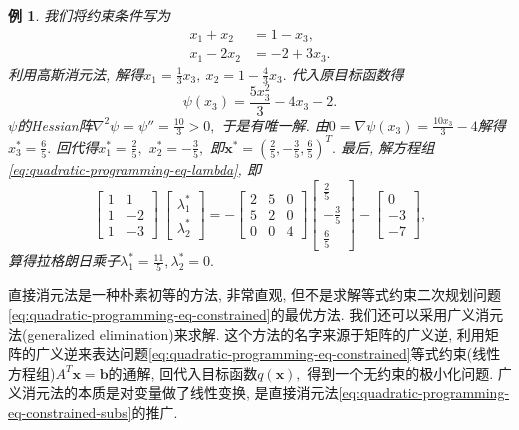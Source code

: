 \documentclass{SBCbookchapter}
\newcommand{\V}[1]{{\bm{#1}}}
\newtheorem{eg}[thm]{例}
\numberwithin{equation}{section}
\begin{document}
\begin{eg}
我们将约束条件写为
\begin{equation*}
\begin{aligned}
x_1 + x_2 & = 1 - x_3, \\
x_1 - 2x_2 & = -2 + 3x_3.
\end{aligned}
\end{equation*}
利用高斯消元法, 解得$x_1 = \frac{1}{3} x_3, ~ x_2 = 1 - \frac{4}{3} x_3.$ 代入原目标函数得
\begin{equation*}
\psi(x_3) = \frac{5 x_{3}^{2}}{3} - 4 x_{3} - 2.
\end{equation*}
$\psi$的Hessian阵$\nabla^2 \psi = \psi'' = \frac{10}{3} > 0,$ 于是有唯一解. 由$0 = \nabla \psi (x_3) = \frac{10 x_{3}}{3} - 4$解得$x_3^* = \frac{6}{5}.$ 回代得$x_1^* = \frac{2}{5},$ $x_2^* = -\frac{3}{5},$ 即$\V{x}^* = \left( \frac{2}{5}, -\frac{3}{5}, \frac{6}{5} \right)^T.$ 最后, 解方程组\eqref{eq:quadratic-programming-eq-lambda}, 即
\begin{equation*}
\begin{bmatrix} 1 & 1 \\ 1 & -2 \\ 1 & -3 \end{bmatrix} ~ \begin{bmatrix} \lambda_1^* \\ \lambda_2^* \end{bmatrix} = - \begin{bmatrix} 2 & 5 & 0 \\ 5 & 2 & 0 \\ 0 & 0 & 4 \end{bmatrix} \begin{bmatrix} \frac{2}{5} \\ -\frac{3}{5} \\ \frac{6}{5} \end{bmatrix} - \begin{bmatrix} 0 \\ -3 \\ -7 \end{bmatrix},
\end{equation*}
算得拉格朗日乘子$\lambda_1^* = \frac{11}{5}, \lambda_2^* = 0.$
\end{eg}

直接消元法是一种朴素初等的方法, 非常直观, 但不是求解等式约束二次规划问题\eqref{eq:quadratic-programming-eq-constrained}的最优方法. 我们还可以采用广义消元法(generalized elimination)来求解. 这个方法的名字来源于矩阵的广义逆, 利用矩阵的广义逆来表达问题\eqref{eq:quadratic-programming-eq-constrained}等式约束(线性方程组)$A^T \V{x} = \V{b}$的通解, 回代入目标函数$q(\V{x}),$ 得到一个无约束的极小化问题. 广义消元法的本质是对变量做了线性变换, 是直接消元法\eqref{eq:quadratic-programming-eq-constrained-subs}的推广.
\end{document}
